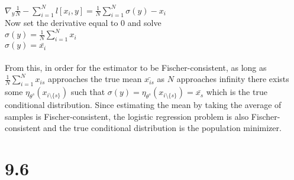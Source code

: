 \documentclass[11pt]{article}
\begin{document}
\begin{enumerate}[a)]
$\nabla_y \frac{1}{N} -\sum_{i=1}^N l[x_{i}, y] = \frac{1}{N} \sum_{i=1}^N \sigma(y) - x_i$\\
Now set the derivative equal to $0$ and solve\\
$\sigma(y) = \frac{1}{N} \sum_{i=1}^N x_{i}$\\
$\sigma(y) = \bar{x_i}$\\
\\
From this, in order for the estimator to be Fischer-consistent, as long as $\frac{1}{N} \sum_{i=1}^N x_{is}$ approaches the true mean $\bar{x_{is}}$ as $N$ approaches infinity there exists some $\eta_{\theta^s}(x_{i \setminus \{s\}})$ such that $\sigma(y) = \eta_{\theta^s}(x_{i \setminus \{s\}}) = \bar{x_s}$ which is the true conditional distribution. Since estimating the mean by taking the average of samples is Fischer-consistent, the logistic regression problem is also Fischer-consistent and the true conditional distribution is the population minimizer.

\end{enumerate}

\newpage

\section*{9.6}
\end{document}
